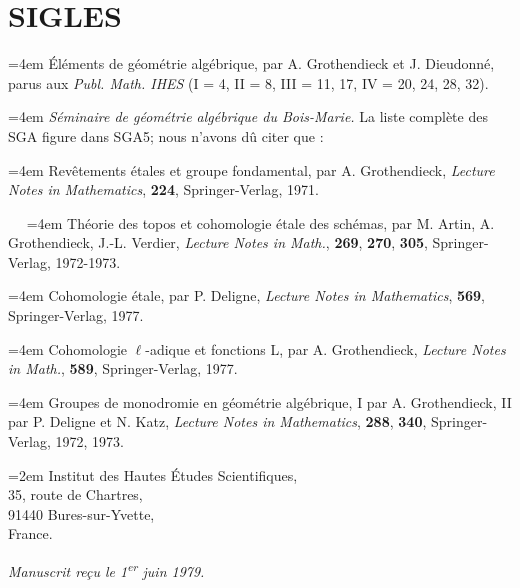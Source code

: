 \documentclass[11pt,leqno]{article}
\newcommand{\Page}[1]{\ifvmode\noindent\else\unskip\ \fi{\footnotesize\textcolor{gray}{[p.\,#1]}}\ \ignorespaces}
\begin{document}
\section*{SIGLES}

{\small
\noindent\hangindent=4em
Éléments de géométrie algébrique, par A. Grothendieck et J. Dieudonné, parus aux \textit{Publ. Math. IHES} (I = 4, II = 8, III = 11, 17, IV = 20, 24, 28, 32).

\noindent\hangindent=4em
\textit{Séminaire de géométrie algébrique du Bois-Marie.} La liste complète des SGA figure dans SGA5; nous n’avons dû citer que :

\noindent\hangindent=4em
Revêtements étales et groupe fondamental, par A. Grothendieck, \textit{Lecture Notes in Mathematics}, \textbf{224}, Springer-Verlag, 1971.

\Page{252}
\noindent\hangindent=4em
Théorie des topos et cohomologie étale des schémas, par M. Artin, A. Grothendieck, J.-L. Verdier, \textit{Lecture Notes in Math.}, \textbf{269}, \textbf{270}, \textbf{305}, Springer-Verlag, 1972-1973.

\noindent\hangindent=4em
Cohomologie étale, par P. Deligne, \textit{Lecture Notes in Mathematics}, \textbf{569}, Springer-Verlag, 1977.

\noindent\hangindent=4em
Cohomologie \(\ell\)-adique et fonctions L, par A. Grothendieck, \textit{Lecture Notes in Math.}, \textbf{589}, Springer-Verlag, 1977.

\noindent\hangindent=4em
Groupes de monodromie en géométrie algébrique, I par A. Grothendieck, II par P. Deligne et N. Katz, \textit{Lecture Notes in Mathematics}, \textbf{288}, \textbf{340}, Springer-Verlag, 1972, 1973.
\par}

\bigskip
{\leftskip=2em
\noindent Institut des Hautes Études Scientifiques,\\
35, route de Chartres,\\
91440 Bures-sur-Yvette,\\
France.
\par}

\bigskip
\begin{flushright}
\textit{Manuscrit reçu le 1\textsuperscript{\textup{er}} juin 1979.}
\end{flushright}
\end{document}
